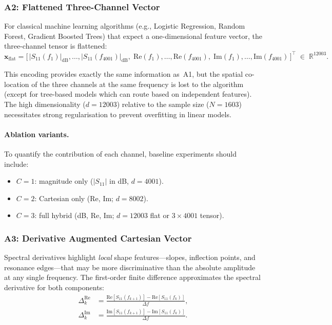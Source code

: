 \subsubsection{A2: Flattened Three-Channel Vector}
\label{sec:repr:routeA:flat}

For classical machine learning algorithms (e.g., Logistic Regression,
Random Forest, Gradient Boosted Trees) that expect a one-dimensional
feature vector, the three-channel tensor is flattened:
\begin{equation}
    \mathbf{x}_{\text{flat}} =
    \bigl[\,|S_{11}(f_1)|_{\text{dB}}, \ldots, |S_{11}(f_{4001})|_{\text{dB}},\;
    \text{Re}(f_1), \ldots, \text{Re}(f_{4001}),\;
    \text{Im}(f_1), \ldots, \text{Im}(f_{4001})\,\bigr]^{\!\top}
    \;\in\;\mathbb{R}^{12003}.
    \label{eq:flat_vector}
\end{equation}

This encoding provides exactly the same information as~A1, but the
spatial co-location of the three channels at the same frequency is
lost to the algorithm (except for tree-based models which can route
based on independent features).  The high dimensionality ($d = 12003$)
relative to the sample size ($N = 1603$) necessitates strong
regularisation to prevent overfitting in linear models.

\paragraph{Ablation variants.}
To quantify the contribution of each channel, baseline experiments
should include:
\begin{itemize}
    \item $C = 1$: magnitude only ($|S_{11}|$ in dB, $d = 4001$).
    \item $C = 2$: Cartesian only (Re, Im; $d = 8002$).
    \item $C = 3$: full hybrid (dB, Re, Im; $d = 12003$ flat or
        $3 \times 4001$ tensor).
\end{itemize}

\subsubsection{A3: Derivative Augmented Cartesian Vector}
\label{sec:repr:routeA:deriv}

Spectral derivatives highlight \emph{local} shape features—slopes,
inflection points, and resonance edges—that may be more discriminative
than the absolute amplitude at any single frequency. The first-order finite
difference approximates the spectral derivative for both components:
\begin{align}
    \Delta_k^{\text{Re}} &= \frac{\text{Re}[S_{11}(f_{k+1})] - \text{Re}[S_{11}(f_k)]}{\Delta f}, \label{eq:first_diff_re} \\
    \Delta_k^{\text{Im}} &= \frac{\text{Im}[S_{11}(f_{k+1})] - \text{Im}[S_{11}(f_k)]}{\Delta f}. \label{eq:first_diff_im}
\end{align}

